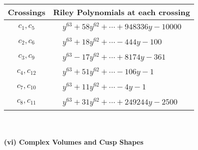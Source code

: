 \documentclass[1p]{elsarticle_modified}
\theoremstyle{definition}
\begin{document}
\begin{tabular}{m{50pt}|m{274pt}}
Crossings & \hspace{64pt}Riley Polynomials at each crossing \\
\hline $$\begin{aligned}c_{1},c_{5}\end{aligned}$$&$\begin{aligned}
&y^{63}+58 y^{62}+\cdots+948336 y-10000
\end{aligned}$\\
\hline $$\begin{aligned}c_{2},c_{6}\end{aligned}$$&$\begin{aligned}
&y^{63}+18 y^{62}+\cdots-444 y-100
\end{aligned}$\\
\hline $$\begin{aligned}c_{3},c_{9}\end{aligned}$$&$\begin{aligned}
&y^{63}-17 y^{62}+\cdots+8174 y-361
\end{aligned}$\\
\hline $$\begin{aligned}c_{4},c_{12}\end{aligned}$$&$\begin{aligned}
&y^{63}+51 y^{62}+\cdots-106 y-1
\end{aligned}$\\
\hline $$\begin{aligned}c_{7},c_{10}\end{aligned}$$&$\begin{aligned}
&y^{63}+11 y^{62}+\cdots-4 y-1
\end{aligned}$\\
\hline $$\begin{aligned}c_{8},c_{11}\end{aligned}$$&$\begin{aligned}
&y^{63}+31 y^{62}+\cdots+249244 y-2500
\end{aligned}$\\
\hline
\end{tabular}\\~\\
\newpage\flushleft \textbf{(vi) Complex Volumes and Cusp Shapes}
\end{document}

